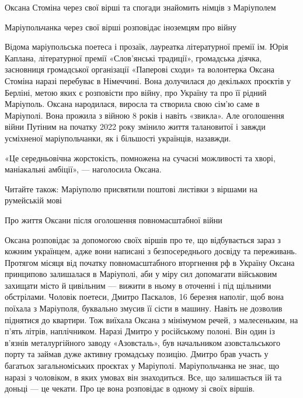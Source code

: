  
 
 
 
 

Оксана Стоміна через свої вірші та спогади знайомить німців з Маріуполем

Маріупольчанка через свої вірші розповідає іноземцям про війну

Відома маріупольська поетеса і прозаїк, лауреатка літературної премії ім. Юрія
Каплана, літературної премії «Слов'янські традиції», громадська діячка,
засновниця громадської організації «Паперові сходи» та волонтерка Оксана
Стоміна наразі перебуває в Німеччині. Вона долучилася до декількох проєктів у
Берліні, метою яких є розповісти про війну, про Україну та про її рідний
Маріуполь. Оксана народилася, виросла та створила свою сім'ю саме в Маріуполі.
Вона прожила з війною 8 років і навіть «звикла». Але оголошення війни Путіним
на початку 2022 року змінило життя талановитої і завжди усміхненої
маріупольчанки, як і більшості українців, назавжди.

«Це середньовічна жорстокість, помножена на сучасні можливості та хворі,
маніакальні амбіції», — наголосила Оксана.

Читайте також: Маріуполю присвятили поштові листівки з віршами на румейській
мові

Про життя Оксани після оголошення повномасштабної війни

Оксана розповідає за допомогою своїх віршів про те, що відбувається зараз з
кожним українцем, адже вони написані з безпосереднього досвіду та переживань.
Протягом місяця від початку повномасштабного вторгнення рф в Україну Оксана
принципово залишалася в Маріуполі, аби у міру сил допомагати військовим
захищати місто й цивільним — вижити в ньому в оточенні і під щільними
обстрілами. Чоловік поетеси, Дмитро Паскалов, 16 березня наполіг, щоб вона
поїхала з Маріуполя, буквально змусив її сісти в машину. Навіть не дозволив
піднятися до квартири. Тож виїхала Оксана з мінімумом речей, з малесеньким, на
п'ять літрів, наплічником. Наразі Дмитро у російському полоні. Він один із
в'язнів металургійного заводу «Азовсталь», був начальником азовстальського
порту та займав дуже активну громадську позицію. Дмитро брав участь у багатьох
загальноміських проєктах у Маріуполі. Маріупольчанка не знає, що наразі з
чоловіком, в яких умовах він знаходиться. Все, що залишається їй та доньці — це
чекати. Про це вона розповідає в одному зі своїх віршів.

